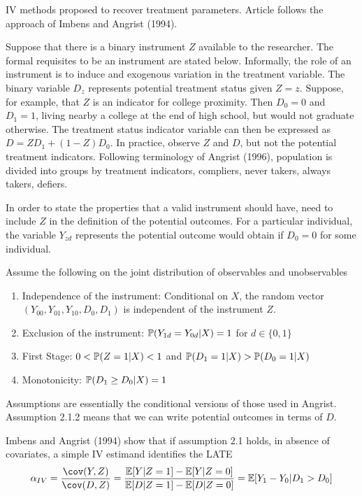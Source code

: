 IV methods proposed to recover treatment parameters. Article follows the approach of Imbens and Angrist (1994).

Suppose that there is a binary instrument $Z$ available to the researcher. The formal requisites to be an instrument are stated below. Informally, the role of an instrument is to induce and exogenous variation in the treatment variable. The binary variable $D_z$ represents potential treatment status given $Z = z$. Suppose, for example, that $Z$ is an indicator for college proximity. Then $D_0 = 0$ and $D_1 = 1$, living nearby a college at the end of high school, but would not graduate otherwise. The treatment status indicator variable can then be expressed as $D = ZD_1 + (1-Z)D_0$. In practice, observe $Z$ and $D$, but not the potential treatment indicators. Following terminology of Angrist (1996), population is divided into groups by treatment indicators, compliers, never takers, always takers, defiers. 

In order to state the properties that a valid instrument should have, need to include $Z$ in the definition of the potential outcomes. For a particular individual, the variable $Y_{zd}$ represents the potential outcome would obtain if $D_0 = 0$ for some individual.

\begin{assumption}
	\label{assm:abadie-2.1}
	Assume the following on the joint distribution of observables and unobservables
	\begin{enumerate}
		\item Independence of the instrument: Conditional on $X$, the random vector $(Y_{00}, Y_{01}, Y_{10}, D_0, D_1)$ is independent of the instrument $Z$.
		\item Exclusion of the instrument: $\P(Y_{1d} = Y_{0d} | X) = 1$ for $d\in\{0,1\}$
		\item First Stage: $0 < \P(Z=1|X) < 1$ and $\P(D_1 = 1 | X) > \P(D_0 = 1 | X)$
		\item Monotonicity: $\P(D_1 \geq D_0 | X) = 1$
	\end{enumerate}
\end{assumption}
Assumptions are essentially the conditional versions of those used in Angrist. Assumption 2.1.2 means that we can write potential outcomes in terms of $D$.

Imbens and Angrist (1994) show that if assumption 2.1 holds, in absence of covariates, a simple IV estimand identifies the LATE 
\begin{equation}
	\label{eq:abadie-2}
	\alpha_{IV} = \frac{\cov(Y,Z)}{\cov(D,Z)} = \frac{\E[Y|Z=1]-\E[Y|Z=0]}{\E[D|Z=1]-\E[D|Z=0]} = \E[Y_1 - Y_0|D_1 > D_0]
\end{equation}

